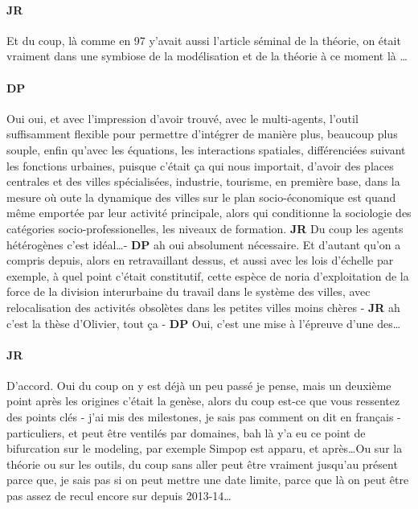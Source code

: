 \documentclass[12pt]{article}
\begin{document}
\paragraph{JR}

Et du coup, là comme en 97 y'avait aussi l'article séminal de la théorie, on était vraiment dans une symbiose de la modélisation et de la théorie à ce moment là \ldots

\paragraph{DP}

Oui oui, et avec l'impression d'avoir trouvé, avec le multi-agents, l'outil suffisamment flexible pour permettre d'intégrer de manière plus, beaucoup plus souple, enfin qu'avec les équations, les interactions spatiales, différenciées suivant les fonctions urbaines, puisque c'était ça qui nous importait, d'avoir des places centrales et des villes spécialisées, industrie, tourisme, en première base, dans la mesure où oute la dynamique des villes sur le plan socio-économique est quand même emportée par leur activité principale, alors qui conditionne la sociologie des catégories socio-professionelles, les niveaux de formation. \textbf{JR} Du coup les agents hétérogènes c'est idéal\ldots - \textbf{DP} ah oui absolument nécessaire. Et d'autant qu'on a compris depuis, alors en retravaillant dessus, et aussi avec les lois d'échelle par exemple, à quel point c'était constitutif, cette espèce de noria d'exploitation de la force de la division interurbaine du travail dans le système des villes, avec relocalisation des activités obsolètes dans les petites villes moins chères - \textbf{JR} ah c'est la thèse d'Olivier, tout ça - \textbf{DP} Oui, c'est une mise à l'épreuve d'une des\ldots 

\paragraph{JR}

D'accord. Oui du coup on y est déjà un peu passé je pense, mais un deuxième point après les origines c'était la genèse, alors du coup est-ce que vous ressentez des points clés - j'ai mis des milestones, je sais pas comment on dit en français - particuliers, et peut être ventilés par domaines, bah là y'a eu ce point de bifurcation sur le modeling, par exemple Simpop est apparu, et après\ldots Ou sur la théorie ou sur les outils, du coup sans aller peut être vraiment jusqu'au présent parce que, je sais pas si on peut mettre une date limite, parce que là on peut être pas assez de recul encore sur depuis 2013-14\ldots 
\end{document}
